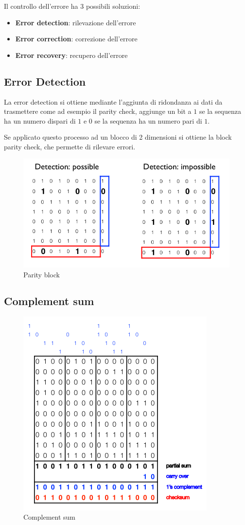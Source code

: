 Il controllo dell'errore ha 3 possibili soluzioni:
\begin{itemize}
	\item \textbf{Error detection}: rilevazione dell'errore
	\item \textbf{Error correction}: correzione dell'errore
	\item \textbf{Error recovery}: recupero dell'errore
\end{itemize}
\subsection{Error Detection}


La error detection si ottiene mediante l'aggiunta di ridondanza ai dati da trasmettere come ad esempio il parity check, aggiunge un bit a $1$ se la sequenza ha un numero dispari di $1$ e $0$ se la sequenza ha un numero pari di $1$.


Se applicato questo processo ad un blocco di 2 dimensioni si ottiene la block parity check, che permette di rilevare errori.

\begin{figure}[!ht]
  \begin{adjustbox}{width=0.5\columnwidth, center}
    \includegraphics{./images/parity_block.png}
  \end{adjustbox}
    \caption{Parity block}
    \label{fig:parity_block}
\end{figure}


\subsection{Complement sum}

\begin{figure}[!ht]
	\centering
	\includegraphics[width=0.4\columnwidth]{./images/complement_sum.png}
	\caption{Complement sum}
	\label{fig:complement_sum}
\end{figure}

